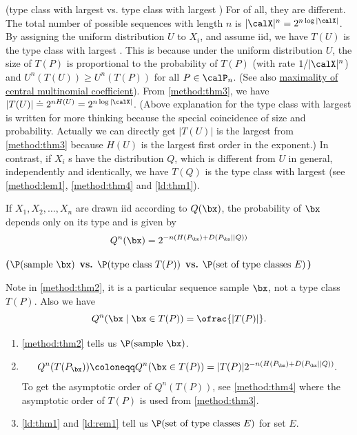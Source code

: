 \documentclass{article}
\newcommand{\bfs}[1]{\textbf{({#1})}}
\begin{document}
\begin{rema}{(type class with largest  vs.  type class with largest )}\label{method:rem2}
For of all, they are different. The total number of possible sequences  with length $n$ is $|\calX|^n= 2^{n\log |\calX|}$. By assigning the uniform distribution $U$ to $X_i$, and assume \gls{iid}, we have $T(U)$ is the type class with largest . This is because under the uniform distribution $U$, the size of $T(P)$ is proportional to the probability of $T(P)$ (with rate $1/|\calX|^n$) and $U^n(T(U))\ge U^n(T(P))$ for all $P\in \calP_n$.  (See also \href{https://djalil.chafai.net/blog/2015/08/29/about-the-central-multinomial-coefficient/}{maximality of central multinomial coefficient}). 
From \cref{method:thm3}, we have $|T(U)|\doteq 2^{nH(U)} = 2^{n\log |\calX|}$. (Above explanation for the type class with largest  is written for more thinking because the special coincidence of size and probability. Actually we can directly get $|T(U)|$ is the largest from \cref{method:thm3} because $H(U)$ is the largest first order in the exponent.)
In contrast, if $X_i$ s have the distribution $Q$, which is different from $U$ in general, independently and identically, we have $T(Q)$ is the type class with largest  (see \cref{method:lem1}, \cref{method:thm4} and \cref{ld:thm1}). 

\end{rema}

\begin{thma}{}\label{method:thm2}
If $X_{1}, X_{2}, \ldots, X_{n}$ are drawn \gls{iid} according to $Q(\bx)$, the probability of $\bx$ depends only on its type and is given by
\begin{align}
Q^{n}( \bx )=2^{-n\left(H\left(P_{ \bx }\right)+D\left(P_{ \bx }|| Q\right)\right)}
\end{align}
\end{thma} 
\begin{rema}{\bfs{$\P(\text{sample } \bx)$ vs. $\P(\text{type class } T(P))$ vs. $\P(\text{set of type classes } E)$}}\label{method:rem4}
 
 Note in \cref{method:thm2}, it is a particular sequence sample $\bx$, not a type class $T(P)$. Also we have $$Q^{n}( \bx\mid \bx\in T(P) ) =\ofrac{|T(P)|}.$$
 \begin{enumerate}
     \item  \cref{method:thm2} tells us $\P(\text{sample } \bx)$.
     \item \begin{align}
    Q^{n}(T(P_{\bx})) \coloneqq Q^{n}(\bx\in T(P))=|T(P)|2^{-n\left(H\left(P_{ \bx }\right)+D\left(P_{ \bx }|| Q\right)\right)}. \label{method:eq1}
    \end{align}
    To get the asymptotic order of $Q^{n}(T(P))$, see \cref{method:thm4} where the asymptotic order of $T(P)$ is used from \cref{method:thm3}.
    \item \cref{ld:thm1} and \cref{ld:rem1} tell us $\P(\text{set of type classes } E)$ for  set $E$.
 \end{enumerate}

\end{rema}
\end{document}
